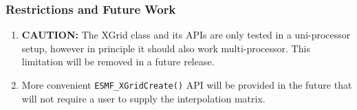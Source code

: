 
\subsubsection{Restrictions and Future Work}

\begin{enumerate}
\label{XGrid:rest}

\item {\bf CAUTION:} The XGrid class and its APIs are only tested in a 
uni-processor setup, however in principle it should also work multi-processor. 
This limitation will be removed in a future release.
\item More convenient {\tt ESMF\_XGridCreate()} API will be provided in
the future that will not require a user to supply the interpolation matrix.

\end{enumerate}



